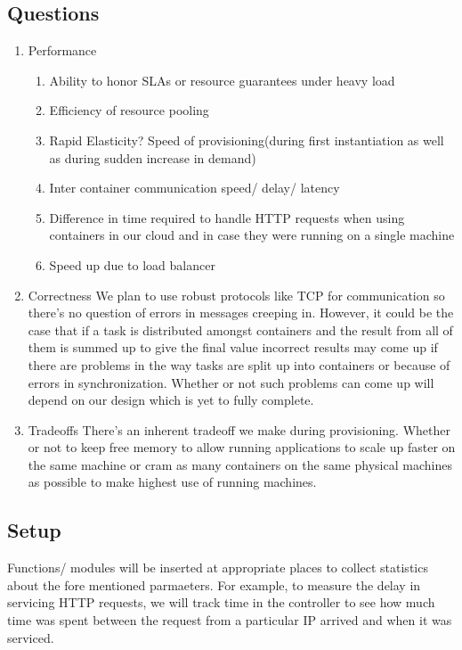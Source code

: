 \documentclass[a4paper]{article}
\begin{document}
  \subsection{Questions}
  \begin{enumerate}
	  
	  \item Performance
	  \begin{enumerate}
	  \item Ability to honor SLAs or resource guarantees under heavy load
	  \item Efficiency of resource pooling
	  \item Rapid Elasticity? Speed of provisioning(during first instantiation as well as during sudden increase in demand)
	  \item Inter container communication speed/ delay/ latency
	  \item Difference in time required to handle HTTP requests when using containers in our cloud and in case they were running on a single machine
	  \item Speed up due to load balancer
	  \end{enumerate}
	  
	  \item Correctness
	  We plan to use robust protocols like TCP for communication so there's no question of errors in messages creeping in. However, it could be the case that if a task is distributed amongst containers and the result from all of them is summed up to give the final value incorrect results may come up if there are problems in the way tasks are split up into containers or because of errors in synchronization. Whether or not such problems can come up will depend on our design which is yet to fully complete.
	  
	  \item Tradeoffs
	  There's an inherent tradeoff we make during provisioning. Whether or not to keep free memory to allow running applications to scale up faster on the same machine or cram as many containers on the same physical machines as possible to make highest use of running machines.
  \end{enumerate}
  
  \subsection{Setup}
  Functions/ modules will be inserted at appropriate places to collect statistics about the fore mentioned parmaeters. For example, to measure the delay in servicing HTTP requests, we will track time in the controller to see how much time was spent between the request from a particular IP arrived and when it was serviced.
  
\end{document}
